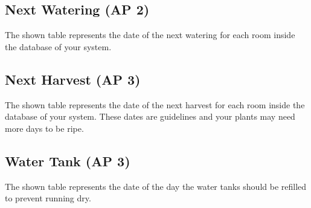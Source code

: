 \subsection{Next Watering (AP 2)}
The shown table represents the date of the next watering for each room inside
the database of your system.

\subsection{Next Harvest (AP 3)}
The shown table represents the date of the next harvest for each room inside
the database of your system. These dates are guidelines and your plants may need
more days to be ripe.

\subsection{Water Tank (AP 3)}
The shown table represents the date of the day the water tanks should be
refilled to prevent running dry.





